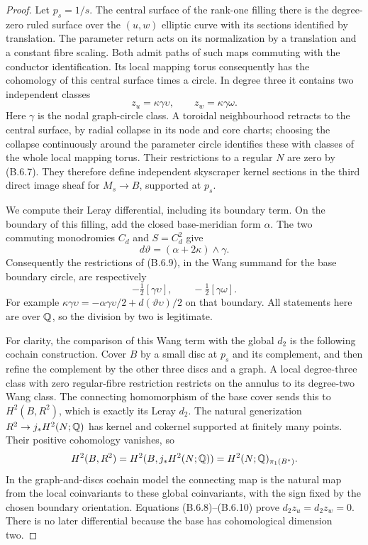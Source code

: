 \begin{proof}
Let $p_s=1/s$. The central surface of the rank-one filling there is
the degree-zero ruled surface over the $(u,w)$ elliptic curve with
its sections identified by translation. The parameter return acts
on its normalization by a translation and a constant fibre scaling.
Both admit paths of such maps commuting with the conductor
identification. Its local mapping torus consequently has the
cohomology of this central surface times a circle. In degree three
it contains two independent classes
\[
 z_u=\kappa\gamma\upsilon,\qquad
 z_w=\kappa\gamma\omega.
 \tag{B.6.9}
\]
Here $\gamma$ is the nodal graph-circle class. A toroidal
neighbourhood retracts to the central surface, by radial collapse
in its node and core charts; choosing the collapse continuously
around the parameter circle identifies these with classes of the
whole local mapping torus. Their restrictions to a regular $N$
are zero by (B.6.7). They therefore define independent skyscraper
kernel sections in the third direct image sheaf for $M_s\to B$,
supported at $p_s$.

We compute their Leray differential, including its boundary term.
On the boundary of this filling, add the closed base-meridian form
$\alpha$. The two commuting monodromies $C_d$ and $S=C_d^2$ give
\[
 d\vartheta=(\alpha+2\kappa)\wedge\gamma.
\]
Consequently the restrictions of (B.6.9), in the Wang summand for
the base boundary circle, are respectively
\[
 -\tfrac12[\gamma\upsilon],\qquad
 -\tfrac12[\gamma\omega].
 \tag{B.6.10}
\]
For example
$\kappa\gamma\upsilon=-\alpha\gamma\upsilon/2+
d(\vartheta\upsilon)/2$ on that boundary. All statements here are
over $\mathbb Q$, so the division by two is legitimate.

For clarity, the comparison of this Wang term with the global
$d_2$ is the following cochain construction. Cover $B$ by a small
disc at $p_s$ and its complement, and then refine the complement
by the other three discs and a graph. A local degree-three class
with zero regular-fibre restriction restricts on the annulus to
its degree-two Wang class. The connecting homomorphism of the
base cover sends this to $H^2(B,R^2)$, which is exactly its Leray
$d_2$. The natural generization $R^2\to j_*H^2(N;\mathbb Q)$ has kernel
and cokernel supported at finitely many points. Their positive
cohomology vanishes, so
\[
 H^2(B,R^2)=H^2(B,j_*H^2(N;\mathbb Q))
          =H^2(N;\mathbb Q)_{\pi_1(B^*)}.
\]
In the graph-and-discs cochain model the connecting map is the
natural map from the local coinvariants to these global
coinvariants, with the sign fixed by the chosen boundary
orientation. Equations (B.6.8)--(B.6.10) prove $d_2z_u=d_2z_w=0$.
There is no later differential because the base has cohomological
dimension two.


\end{proof}
